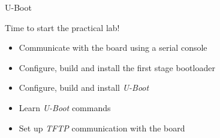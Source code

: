 \setuplabframe
{U-Boot}
{
  Time to start the practical lab!
  \begin{itemize}
  \item Communicate with the board using a serial console
  \item Configure, build and install the first stage bootloader
  \item Configure, build and install {\em U-Boot}
  \item Learn {\em U-Boot} commands
  \item Set up {\em TFTP} communication with the board
  \end{itemize}
}
